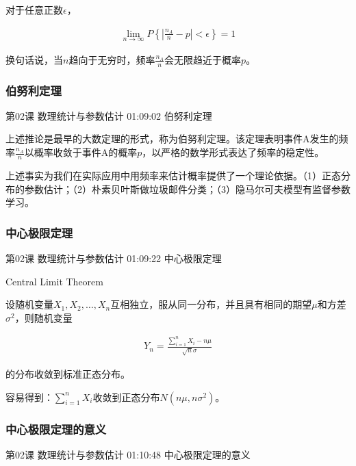 \documentclass[UTF8]{ctexart}
\begin{document}
对于任意正数$\epsilon$，

\begin{equation}
\begin{aligned}
\underset{n \rightarrow \infty}{\lim} P \left \{  |\frac{n_{A}}{n}-p| <\epsilon  \right \}=1
\end{aligned}
\end{equation}

换句话说，当$n$趋向于无穷时，频率$\frac{n_{A}}{n}$会无限趋近于概率$p$。

\subsubsection{伯努利定理}

第02课 数理统计与参数估计 01:09:02 伯努利定理

上述推论是最早的大数定理的形式，称为伯努利定理。该定理表明事件A发生的频率$\frac{n_{A}}{n}$以概率收敛于事件A的概率$p$，以严格的数学形式表达了频率的稳定性。

上述事实为我们在实际应用中用频率来估计概率提供了一个理论依据。（1）正态分布的参数估计；（2）朴素贝叶斯做垃圾邮件分类；（3）隐马尔可夫模型有监督参数学习。

\subsubsection{中心极限定理}

第02课 数理统计与参数估计 01:09:22 中心极限定理

Central Limit Theorem

设随机变量$X_{1},X_{2},\dots,X_{n}$互相独立，服从同一分布，并且具有相同的期望$\mu$和方差$\sigma^{2}$，则随机变量

\begin{equation}
\begin{aligned}
Y_{n}=\frac{\sum_{i=1}^{n}X_{i}-n\mu}{\sqrt{n}\sigma}
\end{aligned}
\end{equation}

的分布收敛到标准正态分布。

容易得到：$\sum_{i=1}^{n}X_{i}$收敛到正态分布$N(n\mu,n\sigma^{2})$。

\subsubsection{中心极限定理的意义}

第02课 数理统计与参数估计 01:10:48 中心极限定理的意义
\end{document}
